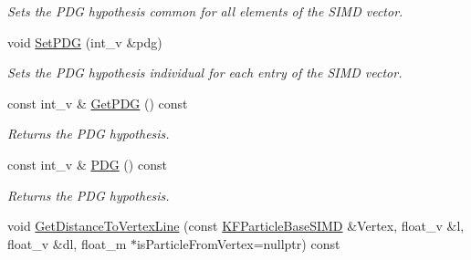 \begin{DoxyCompactItemize}
\begin{DoxyCompactList}\small\item\em Sets the P\+DG hypothesis common for all elements of the S\+I\+MD vector. \end{DoxyCompactList}\item 
void \hyperlink{classKFParticleBaseSIMD_adbc541da175de9f39bf78707a82fe920}{Set\+P\+DG} (int\+\_\+v \&pdg)\hypertarget{classKFParticleBaseSIMD_adbc541da175de9f39bf78707a82fe920}{}\label{classKFParticleBaseSIMD_adbc541da175de9f39bf78707a82fe920}

\begin{DoxyCompactList}\small\item\em Sets the P\+DG hypothesis individual for each entry of the S\+I\+MD vector. \end{DoxyCompactList}\item 
const int\+\_\+v \& \hyperlink{classKFParticleBaseSIMD_a34e19ecaaedf374a347e648eca770ca9}{Get\+P\+DG} () const \hypertarget{classKFParticleBaseSIMD_a34e19ecaaedf374a347e648eca770ca9}{}\label{classKFParticleBaseSIMD_a34e19ecaaedf374a347e648eca770ca9}

\begin{DoxyCompactList}\small\item\em Returns the P\+DG hypothesis. \end{DoxyCompactList}\item 
const int\+\_\+v \& \hyperlink{classKFParticleBaseSIMD_a4d481ddc56411eb602a83003188a33fb}{P\+DG} () const \hypertarget{classKFParticleBaseSIMD_a4d481ddc56411eb602a83003188a33fb}{}\label{classKFParticleBaseSIMD_a4d481ddc56411eb602a83003188a33fb}

\begin{DoxyCompactList}\small\item\em Returns the P\+DG hypothesis. \end{DoxyCompactList}\item 
void \hyperlink{classKFParticleBaseSIMD_a915415876b3372299216507b55399629}{Get\+Distance\+To\+Vertex\+Line} (const \hyperlink{classKFParticleBaseSIMD}{K\+F\+Particle\+Base\+S\+I\+MD} \&Vertex, float\+\_\+v \&l, float\+\_\+v \&dl, float\+\_\+m $\ast$is\+Particle\+From\+Vertex=nullptr) const 
\end{DoxyCompactItemize}
